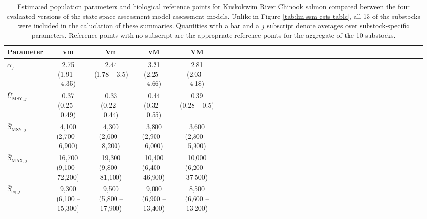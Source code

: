 \documentclass[12pt,]{book}
\theoremstyle{definition}
\theoremstyle{definition}
\theoremstyle{definition}
\theoremstyle{remark}
\begin{document}
\clearpage

\begin{table}[H]

\caption{\label{tab:ssm-ests-table}Estimated population parameters and biological reference points for Kuskokwim River Chinook salmon compared between the four evaluated versions of the state-space assessment model assessment models. Unlike in Figure \ref{tab:lm-ssm-ests-table}, all 13 of the substocks were included in the caluclation of these summaries. Quantities with a bar and a $j$ subscript denote averages over substock-specific parameters. Reference points with no subscript are the appropriate reference points for the aggregate of the 10 substocks.}
\centering
\begin{tabular}[t]{lcccccclcccccclcccccclcccccclcccccc}
\toprule
\textbf{Parameter} & \textbf{vm} & \textbf{Vm} & \textbf{vM} & \textbf{VM}\\
\midrule
$\alpha_j$ & \makecell[c]{2.75\\(1.91 -- 4.35)} & \makecell[c]{2.44\\(1.78 -- 3.5)} & \makecell[c]{3.21\\(2.25 -- 4.66)} & \makecell[c]{2.81\\(2.03 -- 4.18)}\\
$\bar{U}_{\text{MSY},j}$ & \makecell[c]{0.37\\(0.25 -- 0.49)} & \makecell[c]{0.33\\(0.22 -- 0.44)} & \makecell[c]{0.44\\(0.32 -- 0.55)} & \makecell[c]{0.39\\(0.28 -- 0.5)}\\
$\bar{S}_{\text{MSY},j}$ & \makecell[c]{4,100\\(2,700 -- 6,900)} & \makecell[c]{4,300\\(2,600 -- 8,200)} & \makecell[c]{3,800\\(2,900 -- 6,000)} & \makecell[c]{3,600\\(2,800 -- 5,900)}\\
$\bar{S}_{\text{MAX},j}$ & \makecell[c]{16,700\\(9,100 -- 72,200)} & \makecell[c]{19,300\\(9,800 -- 81,100)} & \makecell[c]{10,400\\(6,400 -- 46,900)} & \makecell[c]{10,000\\(6,200 -- 37,500)}\\
$\bar{S}_{\text{eq},j}$ & \makecell[c]{9,300\\(6,100 -- 15,300)} & \makecell[c]{9,500\\(5,800 -- 17,900)} & \makecell[c]{9,000\\(6,900 -- 13,400)} & \makecell[c]{8,500\\(6,600 -- 13,200)}\\

\end{tabular}
\end{table}
\end{document}
